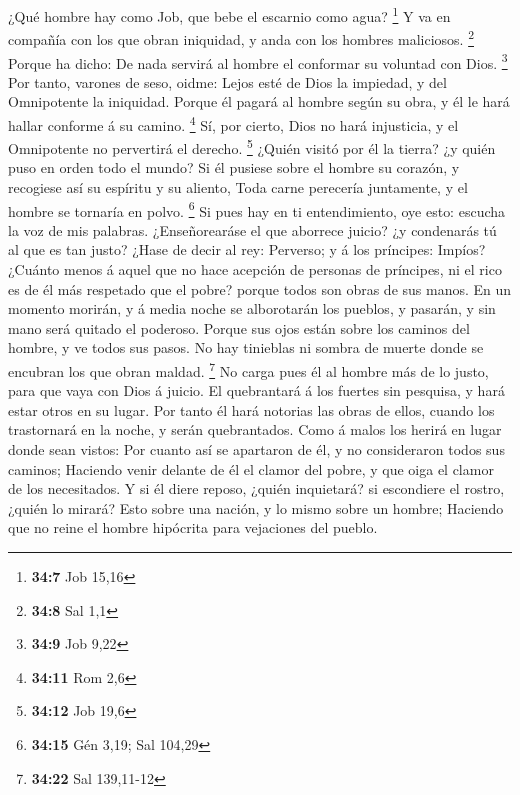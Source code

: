  ¿Qué hombre hay como Job, que bebe el escarnio como agua?
\footnote{\textbf{34:7} Job 15,16}  Y va en compañía con
los que obran iniquidad, y anda con los hombres maliciosos. \footnote{\textbf{34:8}
  Sal 1,1}  Porque ha dicho: De nada servirá al hombre el
conformar su voluntad con Dios. \footnote{\textbf{34:9} Job 9,22}
 Por tanto, varones de seso, oidme: Lejos esté de Dios la
impiedad, y del Omnipotente la iniquidad.  Porque él
pagará al hombre según su obra, y él le hará hallar conforme á su
camino. \footnote{\textbf{34:11} Rom 2,6}  Sí, por
cierto, Dios no hará injusticia, y el Omnipotente no pervertirá el
derecho. \footnote{\textbf{34:12} Job 19,6}  ¿Quién
visitó por él la tierra? ¿y quién puso en orden todo el mundo?
 Si él pusiese sobre el hombre su corazón, y recogiese
así su espíritu y su aliento,  Toda carne perecería
juntamente, y el hombre se tornaría en polvo. \footnote{\textbf{34:15}
  Gén 3,19; Sal 104,29}  Si pues hay en ti entendimiento,
oye esto: escucha la voz de mis palabras.  ¿Enseñorearáse
el que aborrece juicio? ¿y condenarás tú al que es tan justo?
 ¿Hase de decir al rey: Perverso; y á los príncipes:
Impíos?  ¿Cuánto menos á aquel que no hace acepción de
personas de príncipes, ni el rico es de él más respetado que el pobre?
porque todos son obras de sus manos.  En un momento
morirán, y á media noche se alborotarán los pueblos, y pasarán, y sin
mano será quitado el poderoso.  Porque sus ojos están
sobre los caminos del hombre, y ve todos sus pasos.  No
hay tinieblas ni sombra de muerte donde se encubran los que obran
maldad. \footnote{\textbf{34:22} Sal 139,11-12}  No carga
pues él al hombre más de lo justo, para que vaya con Dios á juicio.
 El quebrantará á los fuertes sin pesquisa, y hará estar
otros en su lugar.  Por tanto él hará notorias las obras
de ellos, cuando los trastornará en la noche, y serán quebrantados.
 Como á malos los herirá en lugar donde sean vistos:
 Por cuanto así se apartaron de él, y no consideraron
todos sus caminos;  Haciendo venir delante de él el
clamor del pobre, y que oiga el clamor de los necesitados.
 Y si él diere reposo, ¿quién inquietará? si escondiere
el rostro, ¿quién lo mirará? Esto sobre una nación, y lo mismo sobre un
hombre;  Haciendo que no reine el hombre hipócrita para
vejaciones del pueblo.

